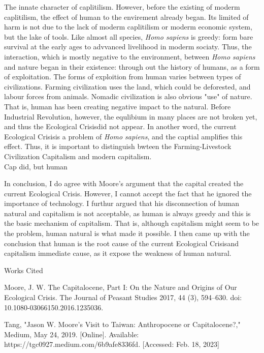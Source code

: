 \documentclass[12pt]{article}
\newcommand{\IR}{Industrial Revolution}
\newcommand{\EC}{Ecological Crisis}
\newcommand{\bibent}{\noindent \hangindent 40pt}
\newenvironment{workscited}{\newpage \begin{center} Works Cited \end{center}}{\newpage }
\begin{document}
\begin{flushleft}

The innate character of caplitilism.
However, before the existing of moderm caplitilism, the effect of human to the envirement already began. Its limited of harm is not due to the lack of moderm caplitilism or moderm economic system, but the lake of tools. Like almost all species, \textit{Homo sapiens} is greedy: form bare survival at the early ages to advvanced livelihood in moderm sociaty. Thus, the interaction, which is mostly negative to the environment, between \textit{Homo sapiens} and nature began in their existence: through out the history of humans, as a form of exploitation. The forms of exploition from human varies between types of civilizations. Farming civilization uses the land, which could be deforested, and labour forces from animals. Nomadic civilization is also obvious "use" of nature. That is, human has been creating negative impact to the natural. Before \IR, however, the equlibium in many places are not broken yet, and thus the \EC did not appear. In another word, the current \EC is a problem of \textit{Homo sapiens}, and the captial amplifies this effect. Thus, it is important to distinguish bwteen the Farming-Livestock Civilization Capitalism and modern capitalism.
\\

Cap did, but human

In conclusion, I do agree with Moore's argument that the capital created the current \EC. However, I cannot accept the fact that he ignored the importance of technology. I furthur argued that his disconnection of human natural and capitalism is not acceptable, as human is always greedy and this is the basic mechanism of capitalism. That is, although capitalism might seem to be the problem, human natural is what made it possible. I then came up with the conclusion that human is the root cause of the current \EC and capitalism immediate cause, as it expose the weakness of human natural.
\newpage



\begin{workscited}

\bibent Moore, J. W. The Capitalocene, Part I: On the Nature and Origins of Our Ecological Crisis. The Journal of Peasant Studies 2017, 44 (3), 594–630. doi: 10.1080-03066150.2016.1235036.

\bibent 
 Tang, "Jason W. Moore's Visit to Taiwan: Anthropocene or Capitalocene?," Medium, May 24, 2019. [Online]. Available: https://tgc0927.medium.com/6b9afe8336fd. [Accessed: Feb. 18, 2023]



\end{workscited}

\end{flushleft}
\end{document}
